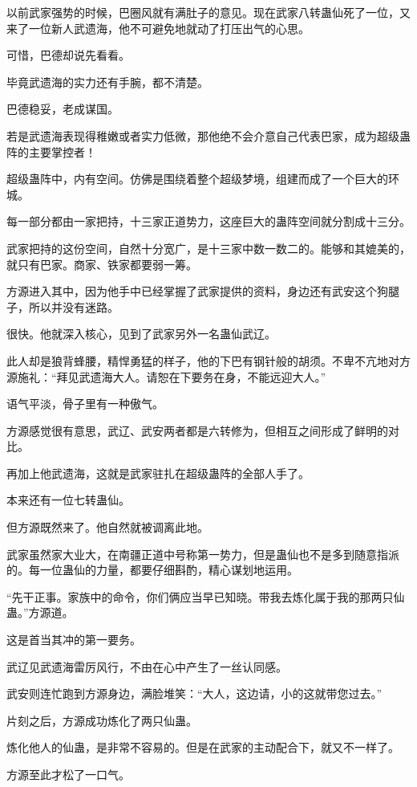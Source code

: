 \begin{this_body}
以前武家强势的时候，巴圈风就有满肚子的意见。现在武家八转蛊仙死了一位，又来了一位新人武遗海，他不可避免地就动了打压出气的心思。

可惜，巴德却说先看看。

毕竟武遗海的实力还有手腕，都不清楚。

巴德稳妥，老成谋国。

若是武遗海表现得稚嫩或者实力低微，那他绝不会介意自己代表巴家，成为超级蛊阵的主要掌控者！

超级蛊阵中，内有空间。仿佛是围绕着整个超级梦境，组建而成了一个巨大的环城。

每一部分都由一家把持，十三家正道势力，这座巨大的蛊阵空间就分割成十三分。

武家把持的这份空间，自然十分宽广，是十三家中数一数二的。能够和其媲美的，就只有巴家。商家、铁家都要弱一筹。

方源进入其中，因为他手中已经掌握了武家提供的资料，身边还有武安这个狗腿子，所以并没有迷路。

很快。他就深入核心，见到了武家另外一名蛊仙武辽。

此人却是狼背蜂腰，精悍勇猛的样子，他的下巴有钢针般的胡须。不卑不亢地对方源施礼：“拜见武遗海大人。请恕在下要务在身，不能远迎大人。”

语气平淡，骨子里有一种傲气。

方源感觉很有意思，武辽、武安两者都是六转修为，但相互之间形成了鲜明的对比。

再加上他武遗海，这就是武家驻扎在超级蛊阵的全部人手了。

本来还有一位七转蛊仙。

但方源既然来了。他自然就被调离此地。

武家虽然家大业大，在南疆正道中号称第一势力，但是蛊仙也不是多到随意指派的。每一位蛊仙的力量，都要仔细斟酌，精心谋划地运用。

“先干正事。家族中的命令，你们俩应当早已知晓。带我去炼化属于我的那两只仙蛊。”方源道。

这是首当其冲的第一要务。

武辽见武遗海雷厉风行，不由在心中产生了一丝认同感。

武安则连忙跑到方源身边，满脸堆笑：“大人，这边请，小的这就带您过去。”

片刻之后，方源成功炼化了两只仙蛊。

炼化他人的仙蛊，是非常不容易的。但是在武家的主动配合下，就又不一样了。

方源至此才松了一口气。


\end{this_body}

